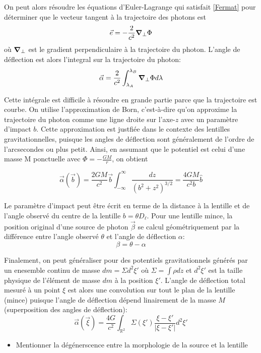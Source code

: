 On peut alors résoudre les équations d'Euler-Lagrange qui satisfait \eqref{Fermat} 
pour déterminer que le vecteur tangent à la trajectoire des photons est 
\begin{equation}\label{eq:vecteur tangent}
        \vec{e} = -\frac{2}{c^{2}} \grad_\perp \Phi
\end{equation} 
où $\grad_\perp$ est le gradient perpendiculaire à la trajectoire du photon.
L'angle de déflection est alors l'integral sur la trajectoire du photon:
\begin{equation}\label{eq:deflection true}
        \vec{\alpha} = \frac{2}{c^{2}}\int_{\lambda_A}^{\lambda_B} \grad_\perp \Phi d\lambda
\end{equation} 

Cette intégrale est difficile à résoudre en grande partie parce que la trajectoire est courbe. 
On utilise l'approximation de Born, c'est-à-dire qu'on approxime la trajectoire 
du photon comme une ligne droite sur l'axe-$z$ avec un paramètre d'impact $b$. Cette approximation est justfiée 
dans le contexte des lentilles gravitationnelles, puisque les angles de déflection sont généralement de 
l'ordre de l'arcsecondes ou plus petit. Ainsi, en assumant que le potentiel est celui d'une masse M
ponctuelle avec $\displaystyle \Phi = -\frac{GM}{r}$,
on obtient

\begin{equation}\label{eq:deflection approx}
        \vec{\alpha}(\vec{b}) = \frac{2GM}{c^{2}} \vec{b} \int_{-\infty }^{\infty } \frac{dz}{(b^{2} + z^{2})^{3/2}} 
        = \frac{4GM}{c^{2}b} \hat{b}
\end{equation} 

Le paramètre d'impact peut être écrit en terme de la distance à la lentille et de l'angle 
observé du centre de la lentille $b = \theta D_{\ell}$. Pour une lentille mince, 
la position original d'une source de photon $\vec{\beta}$ se calcul géométriquement 
par la différence entre l'angle observé $\theta$ et l'angle de déflection $\alpha$:
\begin{equation}\label{eq:equation lentille}
       \beta = \theta - \alpha 
\end{equation} 

Finalement, on peut généraliser pour des potentiels gravitationnels générés 
par un enesemble continu de masse $dm = \Sigma d^{2}\xi'$ où $\Sigma = \int \rho dz$ et 
$d^{2} \xi'$ est la taille physique de l'élément de masse $dm$ à la position $\xi'$. 
L'angle de déflection total mesuré à un point $\xi$ est alors une convolution 
sur tout le plan de la lentille (mince) puisque l'angle de déflection dépend 
linairement de la masse $M$ (superposition des angles de déflection):
\begin{equation}\label{eq:}
        \vec{\alpha}(\vec{\xi}) = \frac{4 G}{c^{2}} \int_{\mathbb{R}^{2}} \Sigma (\xi') \frac{\xi - \xi'}{|\xi - \xi'|}d^{2}\xi'
\end{equation} 
\begin{itemize}
        \item Mentionner la dégénerscence entre la morphologie de la source et la 
                lentille
\end{itemize}

